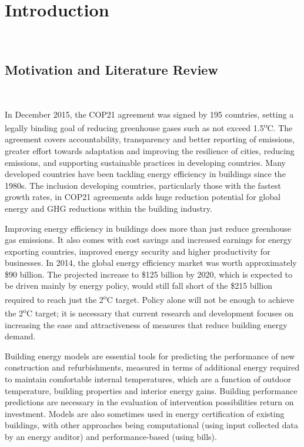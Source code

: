 
\chapter{Introduction}\
\label{ch:introduction}



\section{Motivation and Literature Review}\
\label{ch:motivation}

In December 2015, the COP21 agreement was signed by 195 countries, setting a legally binding goal of reducing greenhouse gases such as not exceed 1.5\textsuperscript{o}C. The agreement covers accountability, transparency and better reporting of emissions, greater effort towards adaptation and improving the resilience of cities, reducing emissions, and supporting sustainable practices in developing countries. Many developed countries have been tackling energy efficiency in buildings since the 1980s. The inclusion developing countries, particularly those with the fastest growth rates, in COP21 agreements adds huge reduction potential for global energy and GHG reductions within the building industry.
 
Improving energy efficiency in buildings does more than just reduce greenhouse gas emissions. It also comes with cost savings and increased earnings for energy exporting countries, improved energy security and higher productivity for businesses\cite{EIA}. In 2014, the global energy efficiency market was worth approximately \$90 billion. The projected increase to \$125 billion by 2020, which is expected to be driven mainly by energy policy, would still fall short of the \$215 billion required to reach just the 2\textsuperscript{o}C target\cite{EIA}. Policy alone will not be enough to achieve the 2\textsuperscript{o}C target; it is necessary that current research and development focuses on increasing the ease and attractiveness of measures that reduce building energy demand.\par 

Building energy models are essential tools for predicting the performance of new construction and refurbishments, measured in terms of additional energy required to maintain comfortable internal temperatures, which are a function of outdoor temperature, building properties and interior energy gains. Building performance predictions are necessary in the evaluation of intervention possibilities return on investment. Models are also sometimes used in energy certification of existing buildings, with other approaches being computational (using input collected data by an energy auditor) and performance-based (using bills).\par


